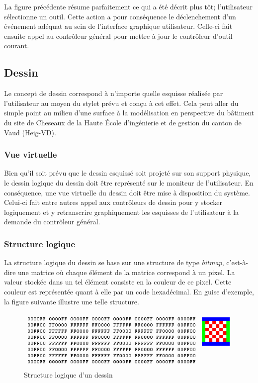 \documentclass[11pt,a4paper,oldfontcommands]{memoir}
\begin{document}
La figure précédente résume parfaitement ce qui a été décrit plus tôt; l'utilisateur sélectionne un outil. Cette action a pour conséquence le déclenchement d'un événement adéquat au sein de l'interface graphique utilisateur. Celle-ci fait ensuite appel au contrôleur général pour mettre à jour le contrôleur d'outil courant.

\newpage

\subsection{Dessin}

Le concept de dessin correspond à n'importe quelle esquisse réalisée par l'utilisateur au moyen du stylet prévu et conçu à cet effet. Cela peut aller du simple point au milieu d'une surface à la modélisation en perspective du bâtiment du site de Cheseaux de la Haute École d'ingénierie et de gestion du canton de Vaud (Heig-VD).

\subsubsection{Vue virtuelle}

Bien qu'il soit prévu que le dessin esquissé soit projeté sur son support physique, le dessin logique du dessin doit être représenté sur le moniteur de l'utilisateur. En conséquence, une vue virtuelle du dessin doit être mise à disposition du système. Celui-ci fait entre autres appel aux contrôleurs de dessin pour y stocker logiquement et y retranscrire graphiquement les esquisses de l'utilisateur à la demande du contrôleur général.

\subsubsection{Structure logique}

La structure logique du dessin se base sur une structure de type \textit{bitmap}, c'est-à-dire une matrice où chaque élément de la matrice correspond à un pixel. La valeur stockée dans un tel élément consiste en la couleur de ce pixel. Cette couleur est représentée quant à elle par un code hexadécimal. En guise d'exemple, la figure suivante illustre une telle structure.

\begin{figure}[h]
\centering
\includegraphics{images/drawing-structure.png}
\caption{Structure logique d'un dessin}
\end{figure}
\end{document}
